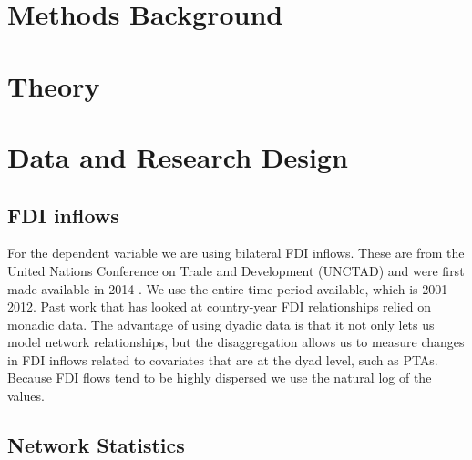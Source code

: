 \documentclass{article}
\begin{document}
\section{Methods Background}

\section{Theory}

\section{Data and Research Design}

\subsection{FDI inflows}

For the dependent variable we are using bilateral FDI inflows. These are from the United Nations Conference on Trade and Development (UNCTAD) and were first made available in 2014 \citep{UNCTAD}. We use the entire time-period available, which is 2001-2012. Past work that has looked at country-year FDI relationships relied on monadic data. The advantage of using dyadic data is that it not only lets us model network relationships, but the disaggregation allows us to measure changes in FDI inflows related to covariates that are at the dyad level, such as PTAs. Because FDI flows tend to be highly dispersed we use the natural log of the values. 

\subsection{Network Statistics}
\end{document}
